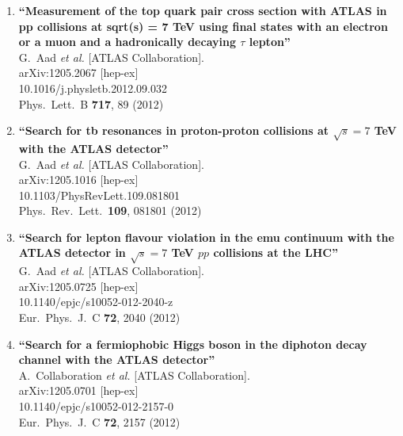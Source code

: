 \documentclass{article}
\begin{document}
\begin{enumerate}
\item%
{\bf ``Measurement of the top quark pair cross section with ATLAS in pp collisions at sqrt(s) = 7 TeV using final states with an electron or a muon and a hadronically decaying $\tau$ lepton''}
  \\{}G.~Aad {\it et al.}  [ATLAS Collaboration].
  \\{}arXiv:1205.2067 [hep-ex]
    \\{}10.1016/j.physletb.2012.09.032
\\{}Phys.\ Lett.\ B {\bf 717}, 89 (2012) %


\item%
{\bf ``Search for tb resonances in proton-proton collisions at $\sqrt{s}=7$ TeV with the ATLAS detector''}
  \\{}G.~Aad {\it et al.}  [ATLAS Collaboration].
  \\{}arXiv:1205.1016 [hep-ex]
    \\{}10.1103/PhysRevLett.109.081801
\\{}Phys.\ Rev.\ Lett.\  {\bf 109}, 081801 (2012) %


\item%
{\bf ``Search for lepton flavour violation in the emu continuum with the ATLAS detector in $\sqrt{s}=7$ TeV $pp$ collisions at the LHC''}
  \\{}G.~Aad {\it et al.}  [ATLAS Collaboration].
  \\{}arXiv:1205.0725 [hep-ex]
    \\{}10.1140/epjc/s10052-012-2040-z
\\{}Eur.\ Phys.\ J.\ C {\bf 72}, 2040 (2012) %


\item%
{\bf ``Search for a fermiophobic Higgs boson in the diphoton decay channel with the ATLAS detector''}
  \\{}A.~Collaboration {\it et al.}  [ATLAS Collaboration].
  \\{}arXiv:1205.0701 [hep-ex]
    \\{}10.1140/epjc/s10052-012-2157-0
\\{}Eur.\ Phys.\ J.\ C {\bf 72}, 2157 (2012) %



\end{enumerate}
\end{document}
